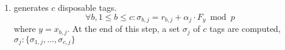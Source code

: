 \begin{enumerate}[leftmargin=.46cm]
\begin{enumerate}
\begin{enumerate}
\item generates $c$ disposable tags.  
$$\forall b, 1\leq b\leq c: \sigma_{\scriptscriptstyle b,j}=r_{\scriptscriptstyle b,j}+\alpha_{\scriptscriptstyle j}\cdot F_{\scriptscriptstyle y}\bmod p$$
where $y= x_{\scriptscriptstyle b,j}$. At the end of this step, a set $\sigma_{\scriptscriptstyle j}$ of $c$ tags are computed,  $\sigma_{\scriptscriptstyle j}:\{\sigma_{\scriptscriptstyle 1,j},..., \sigma_{\scriptscriptstyle c,j}\}$






\end{enumerate} 


\end{enumerate}
\end{enumerate}
